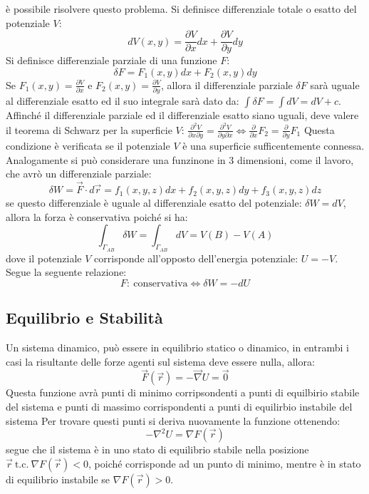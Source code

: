 \documentclass{article}
\numberwithin{equation}{subsection}
\begin{document}
è possibile risolvere questo problema. 
Si definisce differenziale totale o esatto del potenziale $V$:
\begin{equation}
    dV(x,y)=\displaystyle\frac{\partial V}{\partial x}dx+\frac{\partial V}{\partial y}dy
\end{equation}
Si definisce differenziale parziale di una funzione $F$:
\begin{equation}
    \delta F=F_1(x,y)dx+F_2(x,y)dy
\end{equation}
Se $F_1(x,y) = \displaystyle\frac{\partial V}{\partial x}$ e 
$F_2(x,y) = \displaystyle\frac{\partial V}{\partial y}$, 
allora il differenziale parziale $\delta F$ sarà uguale al 
differenziale esatto ed il suo integrale sarà dato da:
$\displaystyle\int\delta F=\int dV=dV+c$.
Affinché il differenziale parziale ed il differenziale esatto 
siano uguali, deve valere il teorema di Schwarz per la superficie 
$V$:
$\displaystyle\frac{\partial ^{2}V}{\partial x\partial y}=\frac{\partial ^{2}V}{\partial y\partial x}\iff \frac{\partial}{\partial x}F_2=\frac{\partial}{\partial y}F_1$
Questa condizione è verificata se il potenziale $V$ è una 
superficie sufficentemente connessa. 
Analogamente si può considerare una funzinone in $3$ dimensioni, 
come il lavoro, che avrò un differenziale parziale: 
\begin{equation}
    \delta W=\vec{F}\cdot d\vec{r}=f_1(x,y,z)dx+f_2(x,y,z)dy+f_3(x,y,z)dz
\end{equation}
se questo differenziale è uguale al differenziale 
esatto del potenziale: $\delta W =dV$, allora la forza 
è conservativa poiché si ha: 
\begin{equation}
    \int_{\Gamma_{AB}}\delta W = \int_{\Gamma_{AB}}dV=V(B)-V(A)
\end{equation}
dove il potenziale $V$ corrisponde all'opposto dell'energia 
potenziale: $U=-V$.
Segue la seguente relazione:
\begin{equation}
    F:\:\mbox{conservativa}\iff\delta W=-dU
\end{equation}

\subsection{Equilibrio e Stabilità}
Un sistema dinamico, può essere in equilibrio statico o dinamico, 
in entrambi i casi la risultante delle forze agenti sul sistema 
deve essere nulla, allora:
\begin{equation}
    \vec{F}(\vec{r})=-\vec{\nabla}U=\vec{0}
\end{equation}
Questa funzione avrà punti di minimo corripsondenti a 
punti di equilbirio stabile del sistema e punti di massimo 
corrispondenti a punti di equilirbio instabile del sistema 
Per trovare questi punti si deriva nuovamente la funzione 
ottenendo:
\begin{equation}
    -\nabla^{2}U=\nabla F(\vec{r})
\end{equation}
segue che il sistema è in uno stato di equilibrio stabile nella 
posizione $\vec{r}\:\mbox{t.c.}\:\nabla F(\vec{r})<0$, poiché 
corrisponde ad un punto di minimo, mentre è in stato di 
equilibrio instabile se $\nabla F(\vec{r})>0$.
\end{document}
